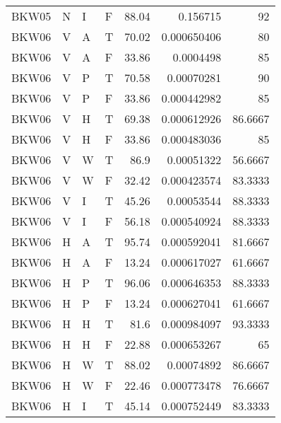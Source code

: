\begin{longtable}{llllrrr}
    BKW05    & N         & I         & F          & 88.04      & 0.156715    & 92       \\
    BKW06    & V         & A         & T          & 70.02      & 0.000650406 & 80       \\
    BKW06    & V         & A         & F          & 33.86      & 0.0004498   & 85       \\
    BKW06    & V         & P         & T          & 70.58      & 0.00070281  & 90       \\
    BKW06    & V         & P         & F          & 33.86      & 0.000442982 & 85       \\
    BKW06    & V         & H         & T          & 69.38      & 0.000612926 & 86.6667  \\
    BKW06    & V         & H         & F          & 33.86      & 0.000483036 & 85       \\
    BKW06    & V         & W         & T          & 86.9       & 0.00051322  & 56.6667  \\
    BKW06    & V         & W         & F          & 32.42      & 0.000423574 & 83.3333  \\
    BKW06    & V         & I         & T          & 45.26      & 0.00053544  & 88.3333  \\
    BKW06    & V         & I         & F          & 56.18      & 0.000540924 & 88.3333  \\
    BKW06    & H         & A         & T          & 95.74      & 0.000592041 & 81.6667  \\
    BKW06    & H         & A         & F          & 13.24      & 0.000617027 & 61.6667  \\
    BKW06    & H         & P         & T          & 96.06      & 0.000646353 & 88.3333  \\
    BKW06    & H         & P         & F          & 13.24      & 0.000627041 & 61.6667  \\
    BKW06    & H         & H         & T          & 81.6       & 0.000984097 & 93.3333  \\
    BKW06    & H         & H         & F          & 22.88      & 0.000653267 & 65       \\
    BKW06    & H         & W         & T          & 88.02      & 0.00074892  & 86.6667  \\
    BKW06    & H         & W         & F          & 22.46      & 0.000773478 & 76.6667  \\
    BKW06    & H         & I         & T          & 45.14      & 0.000752449 & 83.3333  \\

\end{longtable}
